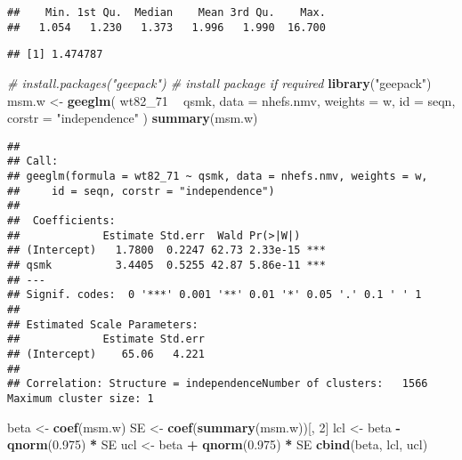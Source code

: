 \documentclass[
  10pt,
]{book}
\newenvironment{Shaded}{\begin{snugshade}}{\end{snugshade}}
\newcommand{\CommentTok}[1]{\textcolor[rgb]{0.56,0.35,0.01}{\textit{#1}}}
\newcommand{\DataTypeTok}[1]{\textcolor[rgb]{0.13,0.29,0.53}{#1}}
\newcommand{\DecValTok}[1]{\textcolor[rgb]{0.00,0.00,0.81}{#1}}
\newcommand{\FloatTok}[1]{\textcolor[rgb]{0.00,0.00,0.81}{#1}}
\newcommand{\KeywordTok}[1]{\textcolor[rgb]{0.13,0.29,0.53}{\textbf{#1}}}
\newcommand{\NormalTok}[1]{#1}
\newcommand{\OperatorTok}[1]{\textcolor[rgb]{0.81,0.36,0.00}{\textbf{#1}}}
\newcommand{\StringTok}[1]{\textcolor[rgb]{0.31,0.60,0.02}{#1}}
\begin{document}
\begin{verbatim}
##    Min. 1st Qu.  Median    Mean 3rd Qu.    Max. 
##   1.054   1.230   1.373   1.996   1.990  16.700
\end{verbatim}

\begin{Shaded}
\end{Shaded}

\begin{verbatim}
## [1] 1.474787
\end{verbatim}

\begin{Shaded}
\begin{Highlighting}[]
\CommentTok{# install.packages("geepack") # install package if required}
\KeywordTok{library}\NormalTok{(}\StringTok{"geepack"}\NormalTok{)}
\NormalTok{msm.w <-}\StringTok{ }\KeywordTok{geeglm}\NormalTok{(}
\NormalTok{  wt82_}\DecValTok{71} \OperatorTok{~}\StringTok{ }\NormalTok{qsmk,}
  \DataTypeTok{data =}\NormalTok{ nhefs.nmv,}
  \DataTypeTok{weights =}\NormalTok{ w,}
  \DataTypeTok{id =}\NormalTok{ seqn,}
  \DataTypeTok{corstr =} \StringTok{"independence"}
\NormalTok{)}
\KeywordTok{summary}\NormalTok{(msm.w)}
\end{Highlighting}
\end{Shaded}

\begin{verbatim}
## 
## Call:
## geeglm(formula = wt82_71 ~ qsmk, data = nhefs.nmv, weights = w, 
##     id = seqn, corstr = "independence")
## 
##  Coefficients:
##             Estimate Std.err  Wald Pr(>|W|)    
## (Intercept)   1.7800  0.2247 62.73 2.33e-15 ***
## qsmk          3.4405  0.5255 42.87 5.86e-11 ***
## ---
## Signif. codes:  0 '***' 0.001 '**' 0.01 '*' 0.05 '.' 0.1 ' ' 1
## 
## Estimated Scale Parameters:
##             Estimate Std.err
## (Intercept)    65.06   4.221
## 
## Correlation: Structure = independenceNumber of clusters:   1566   Maximum cluster size: 1
\end{verbatim}

\begin{Shaded}
\begin{Highlighting}[]
\NormalTok{beta <-}\StringTok{ }\KeywordTok{coef}\NormalTok{(msm.w)}
\NormalTok{SE <-}\StringTok{ }\KeywordTok{coef}\NormalTok{(}\KeywordTok{summary}\NormalTok{(msm.w))[, }\DecValTok{2}\NormalTok{]}
\NormalTok{lcl <-}\StringTok{ }\NormalTok{beta }\OperatorTok{-}\StringTok{ }\KeywordTok{qnorm}\NormalTok{(}\FloatTok{0.975}\NormalTok{) }\OperatorTok{*}\StringTok{ }\NormalTok{SE}
\NormalTok{ucl <-}\StringTok{ }\NormalTok{beta }\OperatorTok{+}\StringTok{ }\KeywordTok{qnorm}\NormalTok{(}\FloatTok{0.975}\NormalTok{) }\OperatorTok{*}\StringTok{ }\NormalTok{SE}
\KeywordTok{cbind}\NormalTok{(beta, lcl, ucl)}
\end{Highlighting}
\end{Shaded}
\end{document}
